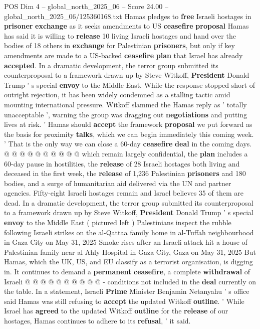 \begin{textsample}{POS Dim 4 – global\_north\_2025\_06 – Score 24.00 – global\_north\_2025\_06/125360168.txt}  \label{ex:f4_pos_381}
Hamas pledges to \textbf{free} Israeli hostages in \textbf{prisoner} \textbf{exchange} as it seeks amendments to US \textbf{ceasefire} \textbf{proposal} Hamas has said it is willing to \textbf{release} 10 living Israeli hostages and hand over the bodies of 18 others in \textbf{exchange} for Palestinian \textbf{prisoners}, but only if key amendments are made to a US-backed \textbf{ceasefire} \textbf{plan} that Israel has already \textbf{accepted}.
In a dramatic development, the terror group submitted its counterproposal to a framework drawn up by Steve Witkoff, \textbf{President} Donald Trump ' s special \textbf{envoy} to the Middle East.
While the response stopped short of outright rejection, it has been widely condemned as a stalling tactic amid mounting international pressure.
Witkoff slammed the Hamas reply as ' totally unacceptable ', warning the group was dragging out \textbf{negotiations} and putting lives at risk. ' Hamas should \textbf{accept} the framework \textbf{proposal} we put forward as the basis for proximity \textbf{talks}, which we can begin immediately this coming week. ' That is the only way we can close a 60-day \textbf{ceasefire} \textbf{deal} in the coming days. @ @ @ @ @ @ @ @ @ @ which remain largely confidential, the \textbf{plan} includes a 60-day pause in hostilities, the \textbf{release} of 28 Israeli hostages both living and deceased in the first week, the \textbf{release} of 1,236 Palestinian \textbf{prisoners} and 180 bodies, and a surge of humanitarian aid delivered via the UN and partner agencies.
Fifty-eight Israeli hostages remain and Israel believes 35 of them are dead.
In a dramatic development, the terror group submitted its counterproposal to a framework drawn up by Steve Witkoff, \textbf{President} Donald Trump ' s special \textbf{envoy} to the Middle East ( pictured left ) Palestinians inspect the rubble following Israeli strikes on the al-Qattaa family home in al-Tuffah neighbourhood in Gaza City on May 31, 2025 Smoke rises after an Israeli attack hit a house of Palestinian family near al Ahly Hospital in Gaza City, Gaza on May 31, 2025 But Hamas, which the UK, US, and EU classify as a terrorist organisation, is digging in.
It continues to demand a \textbf{permanent} \textbf{ceasefire}, a complete \textbf{withdrawal} of Israeli @ @ @ @ @ @ @ @ @ @ - conditions not included in the \textbf{deal} currently on the table.
In a statement, Israeli \textbf{Prime} Minister Benjamin Netanyahu ' s office said Hamas was still refusing to \textbf{accept} the updated Witkoff \textbf{outline}. ' While Israel has \textbf{agreed} to the updated Witkoff \textbf{outline} for the \textbf{release} of our hostages, Hamas continues to adhere to its \textbf{refusal}, ' it said.

\end{textsample}
